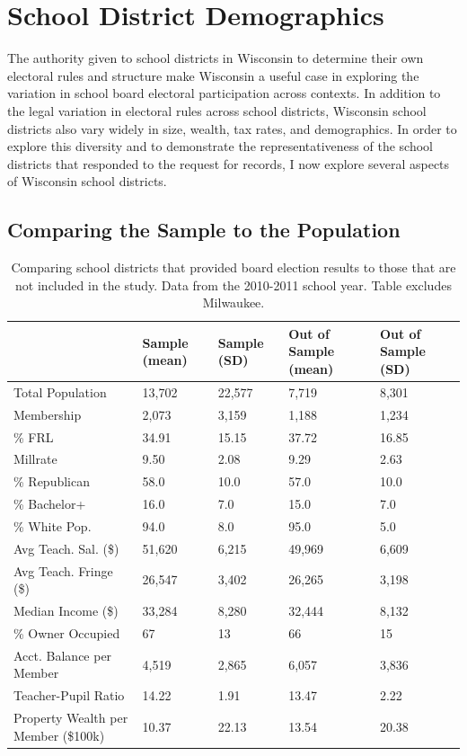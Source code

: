 \clearpage
\section{School District Demographics}

The authority given to school districts in Wisconsin to determine their own
electoral 
rules and structure make Wisconsin a useful case in exploring the variation in 
school board electoral participation across contexts. In addition to the legal 
variation in electoral rules across school districts, Wisconsin school districts 
also vary widely in size, wealth, tax rates, and demographics. In order to 
explore this diversity and to demonstrate the representativeness of the school 
districts that responded to the request for records, I now explore several aspects 
of Wisconsin school districts. 

\subsection{Comparing the Sample to the Population}



\begin{table}[ht]
\centering
{\scriptsize
\begin{tabular}{p{1.5in}p{.8in}p{.8in}p{.8in}p{.8in}}
  \hline
 & Sample (mean) & Sample (SD) & Out of Sample (mean) & Out of Sample (SD) \\ 
  \hline
Total Population & 13,702 & 22,577 & 7,719 & 8,301 \\ 
  Membership & 2,073 & 3,159 & 1,188 & 1,234 \\ 
  \% FRL & 34.91 & 15.15 & 37.72 & 16.85 \\ 
  Millrate & 9.50 & 2.08 & 9.29 & 2.63 \\ 
  \% Republican & 58.0 & 10.0 & 57.0 & 10.0 \\ 
  \% Bachelor+ & 16.0 & 7.0 & 15.0 & 7.0 \\ 
  \% White Pop. & 94.0 & 8.0 & 95.0 & 5.0 \\ 
  Avg Teach. Sal. (\$) & 51,620 & 6,215 & 49,969 & 6,609 \\ 
  Avg Teach. Fringe (\$) & 26,547 & 3,402 & 26,265 & 3,198 \\ 
  Median Income (\$) & 33,284 & 8,280 & 32,444 & 8,132 \\ 
  \% Owner Occupied & 67 & 13 & 66 & 15 \\ 
  Acct. Balance per Member & 4,519 & 2,865 & 6,057 & 3,836 \\ 
  Teacher-Pupil Ratio & 14.22 & 1.91 & 13.47 & 2.22 \\ 
  Property Wealth per Member (\$100k) & 10.37 & 22.13 & 13.54 & 20.38 \\ 
   \hline
\end{tabular}
}
\caption{Comparing school districts that provided board election results to those that are not included in the study. Data from the 2010-2011 school year. Table excludes 
                      Milwaukee.} 
\label{tab:samplecomp}
\end{table}



